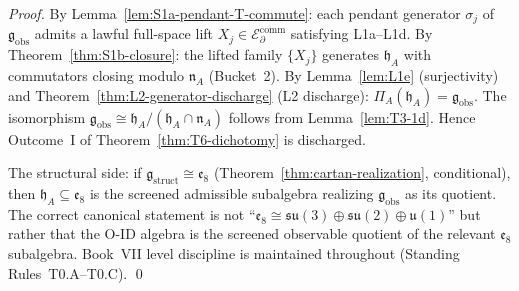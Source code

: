 \documentclass[12pt,oneside]{amsbook}
\theoremstyle{plain}
\theoremstyle{definition}
\theoremstyle{remark}
\begin{document}
\begin{proof}
By Lemma~\ref{lem:S1a-pendant-T-commute}: each pendant generator
$\sigma_j$ of $\mathfrak{g}_{\mathrm{obs}}$ admits a lawful
full-space lift $X_j \in \mathcal{E}_\partial^{\mathrm{comm}}$
satisfying L1a--L1d. By Theorem~\ref{thm:S1b-closure}: the lifted
family $\{X_j\}$ generates $\mathfrak{h}_A$ with commutators
closing modulo $\mathfrak{n}_A$ (Bucket~2). By
Lemma~\ref{lem:L1e} (surjectivity) and
Theorem~\ref{thm:L2-generator-discharge} (L2 discharge):
$\Pi_A(\mathfrak{h}_A) = \mathfrak{g}_{\mathrm{obs}}$. The
isomorphism $\mathfrak{g}_{\mathrm{obs}} \cong \mathfrak{h}_A /
(\mathfrak{h}_A \cap \mathfrak{n}_A)$ follows from
Lemma~\ref{lem:T3-1d}. Hence Outcome~I of
Theorem~\ref{thm:T6-dichotomy} is discharged.

The structural side: if $\mathfrak{g}_{\mathrm{struct}} \cong
\mathfrak{e}_8$ (Theorem~\ref{thm:cartan-realization}, conditional),
then $\mathfrak{h}_A \subseteq \mathfrak{e}_8$ is the screened
admissible subalgebra realizing $\mathfrak{g}_{\mathrm{obs}}$ as its
quotient. The correct canonical statement is not
``$\mathfrak{e}_8 \cong
\mathfrak{su}(3)\oplus\mathfrak{su}(2)\oplus\mathfrak{u}(1)$''
but rather that the O-ID algebra is the screened observable quotient
of the relevant $\mathfrak{e}_8$ subalgebra.
Book~VII level discipline is maintained throughout
(Standing Rules~T0.A--T0.C). \qed
\end{proof}
\end{document}
